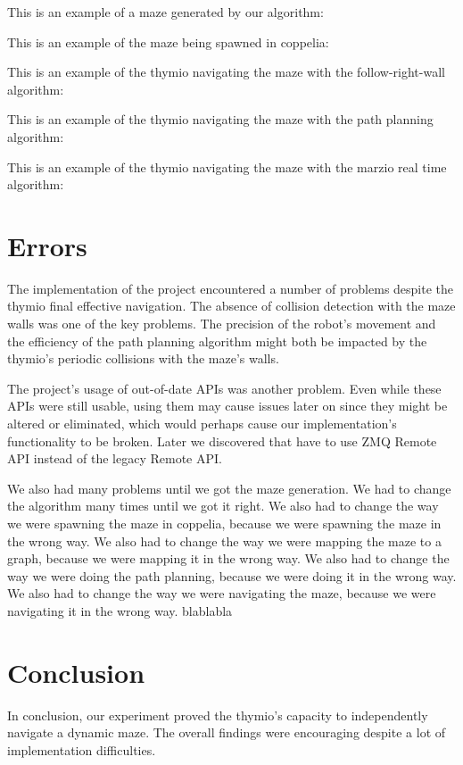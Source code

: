 \documentclass[12pt, a4paper, twocolumn]{article}
\begin{document}
This is an example of a maze generated by our algorithm:


This is an example of the maze being spawned in coppelia:


This is an example of the thymio navigating the maze with the follow-right-wall algorithm:


This is an example of the thymio navigating the maze with the path planning algorithm:


This is an example of the thymio navigating the maze with the marzio real time algorithm:

\section{Errors}

The implementation of the project encountered a number of problems despite the thymio final effective navigation. The absence of collision detection with the maze walls was one of the key problems. The precision of the robot's movement and the efficiency of the path planning algorithm might both be impacted by the thymio's periodic collisions with the maze's walls.

The project's usage of out-of-date APIs was another problem. Even while these APIs were still usable, using them may cause issues later on since they might be altered or eliminated, which would perhaps cause our implementation's functionality to be broken. Later we discovered that have to use ZMQ Remote API instead of the legacy Remote API.

We also had many problems until we got the maze generation. We had to change the algorithm many times until we got it right. We also had to change the way we were spawning the maze in coppelia, because we were spawning the maze in the wrong way. We also had to change the way we were mapping the maze to a graph, because we were mapping it in the wrong way. We also had to change the way we were doing the path planning, because we were doing it in the wrong way. We also had to change the way we were navigating the maze, because we were navigating it in the wrong way. blablabla

\section{Conclusion}

In conclusion, our experiment proved the thymio's capacity to independently navigate a dynamic maze. The overall findings were encouraging despite a lot of implementation difficulties.
\end{document}
